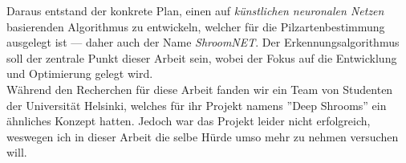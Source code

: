  Daraus entstand der konkrete Plan, einen auf \textit{künstlichen neuronalen Netzen} basierenden Algorithmus zu entwickeln, welcher für die Pilzartenbestimmung ausgelegt ist --- daher auch der Name \textit{ShroomNET}. Der Erkennungsalgorithmus soll der zentrale Punkt dieser Arbeit sein, wobei der Fokus auf die Entwicklung und Optimierung gelegt wird.\\
 
 Während den Recherchen für diese Arbeit fanden wir ein Team von Studenten der Universität Helsinki, welches für ihr Projekt namens ''Deep Shrooms''\cite{deepshroom} ein ähnliches Konzept hatten. Jedoch war das Projekt leider nicht erfolgreich, weswegen ich in dieser Arbeit die selbe Hürde umso mehr zu nehmen versuchen will.
 
 
 